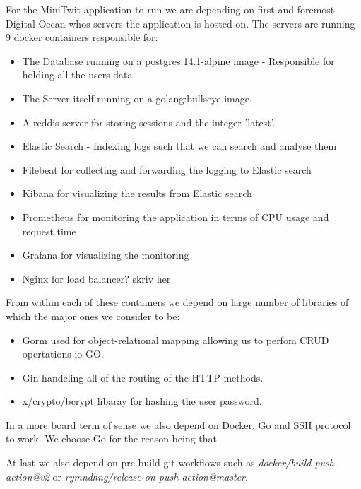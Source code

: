 For the MiniTwit application to run we are depending on first and foremost Digital Oecan whos servers the application is 
hosted on. The servers are running 9 docker containers responsible for: 
\begin{itemize}
    \item The Database running on a postgres:14.1-alpine image - Responsible for holding all the users data.
    \item The Server itself running on a golang:bullseye image.
    \item A reddis server for storing sessions and the integer 'latest'.
    \item Elastic Search - Indexing logs such that we can search and analyse them
    \item Filebeat for collecting and forwarding the logging to Elastic search
    \item Kibana for visualizing the results from Elastic search
    \item Prometheus for monitoring the application in terms of CPU usage and request time
    \item Grafana for visualizing the monitoring
    \item Nginx for load balancer? skriv her
\end{itemize}

From within each of these containers we depend on large number of libraries of which the major ones we consider to be:
\begin{itemize}
    \item Gorm used for object-relational mapping allowing us to perfom CRUD opertations io GO.
    \item Gin handeling all of the routing of the HTTP methods.
    \item x/crypto/bcrypt libaray for hashing the user password.
\end{itemize}

In a more board term of sense we also depend on Docker, Go and SSH protocol to work. We choose Go for the reason being 
that  

At last we also depend on pre-build git workflows such as \textit{docker/build-push-action@v2} or \textit{rymndhng/release-on-push-action@master}.



